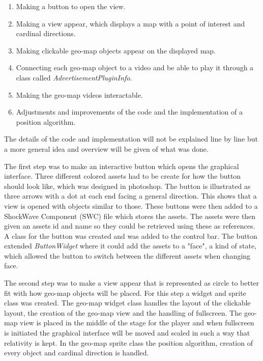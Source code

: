 \begin{enumerate}
\item Making a button to open the view.

\item Making a view appear, which displays a map with a point of interest and cardinal directions.

\item Making clickable geo-map objects appear on the displayed map.

\item Connecting each geo-map object to a video and be able to play it through a class called \textit{AdvertisementPluginInfo}.

\item Making the geo-map videos interactable.


\item Adjustments and improvements of the code and the implementation of a position algorithm. 
\end{enumerate}

The details of the code and implementation will not be explained line by line but a more general idea and overview will be given of what was done.

The first step was to make an interactive button which opens the graphical interface. Three different colored assets had to be create for how the button should look like, which was designed in photoshop. The button is illustrated as three arrows with a dot at each end facing a general direction. This shows that a view is opened with objects similar to those. These buttons were then added to a ShockWave Component (SWC) file which stores the assets. The assets were then given an assets id and name so they could be retrieved using these as references. A class for the button was created and was added to the control bar. The button extended \textit{ButtonWidget} where it could add the assets to a "face", a kind of state, which allowed the button to switch between the different assets when changing face. 

The second step was to make a view appear that is represented as circle to better fit with how geo-map objects will be placed. For this step a widget and sprite class was created. The geo-map widget class handles the layout of the clickable layout, the creation of the geo-map view and the handling of fullscreen. The geo-map view is placed in the middle of the stage for the player and when fullscreen is initiated the graphical interface will be moved and scaled in such a way that relativity is kept. In the geo-map sprite class the position algorithm, creation of every object and cardinal direction is handled.

